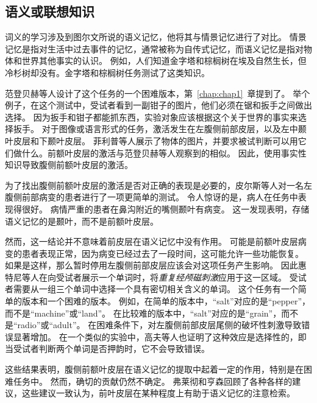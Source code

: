 \subsection{语义或联想知识}
\par
词义的学习涉及到图尔文\cite{tulving1983elements}所说的语义记忆，他将其与情景记忆进行了对比。
情景记忆是指对生活中过去事件的记忆，通常被称为自传式记忆，而语义记忆是指对物体和世界其他事实的认识。
例如，人们知道金字塔和棕榈树在埃及自然生长，但冷杉树却没有。金字塔和棕榈树任务测试了这类知识\cite{howard1992pyramids}。
\par


范登贝赫等人\cite{vandenberghe1996functional}设计了这个任务的一个困难版本，第~\ref{chap:chap1}~章提到了。
举个例子，在这个测试中，受试者看到一副钳子的图片，他们必须在锯和扳手之间做出选择。
因为扳手和钳子都能抓东西，实验对象应该根据这个关于世界的事实来选择扳手。
对于图像或语言形式的任务，激活发生在左腹侧前部皮层，以及左中颞叶皮层和下颞叶皮层。
菲利普等人\cite{phillips2002neural}展示了物体的图片，并要求被试判断可以用它们做什么。前额叶皮层的激活与范登贝赫等人观察到的相似。
因此，使用事实性知识导致腹侧前额叶皮层的激活。
\par


为了找出腹侧前额叶皮层的激活是否对正确的表现是必要的，皮尔斯等人\cite{price1999delineating}对一名左腹侧前部病变的患者进行了一项更简单的测试。
令人惊讶的是，病人在任务中表现得很好。
病情严重的患者在鼻沟附近的嘴侧颞叶有病变\cite{davies2004human}。
这一发现表明，存储语义记忆的是颞叶，而不是前额叶皮层。
\par


然而，这一结论并不意味着前皮层在语义记忆中没有作用。
可能是前额叶皮层病变的患者表现正常，因为病变已经过去了一段时间，这可能允许一些功能恢复。
如果是这样，那么暂时停用左腹侧前部皮层应该会对这项任务产生影响。
因此惠特尼等人\cite{whitney2011neural}在向受试者展示一个单词时，将\textit{重复经颅磁刺激}应用于这一区域。
受试者需要从一组三个单词中选择一个具有密切相关含义的单词。
这个任务有一个简单的版本和一个困难的版本。
例如，在简单的版本中，“salt”对应的是“pepper”，而不是“machine”或“land”。
在比较难的版本中，“salt”对应的是“grain”，而不是“radio”或“adult”。
在困难条件下，对左腹侧前部皮层尾侧的破坏性刺激导致错误显著增加。
在一个类似的实验中，高夫等人\cite{gough2005dissociating}也证明了这种效应是选择性的，即当受试者判断两个单词是否押韵时，它不会导致错误。
\par


这些结果表明，腹侧前额叶皮层在语义记忆的提取中起着一定的作用，特别是在困难任务中。
然而，确切的贡献仍然不确定。
弗莱彻和亨森\cite{fletcher2001frontal}回顾了各种各样的建议，这些建议一致认为，前叶皮层在某种程度上有助于语义记忆的注意检索。
\par


